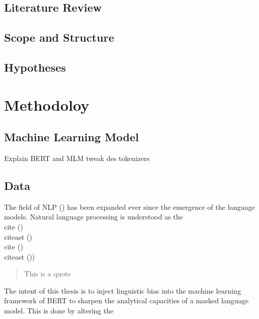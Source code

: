 \documentclass[english]{ttlab-qualify}
\begin{document}
    \section{Literature Review}
    \section{Scope and Structure}

    \section{Hypotheses}


    \chapter{Methodoloy}

    \section{Machine Learning Model}
    Explain BERT and MLM
    tweak des tokenizers
    \section{Data}



    



    The field of NLP  (\cite{METZLER2016}) has been expanded ever since the emergence of the language models.
    Natural language processing is understood as the
    \\

    cite (\cite{METZLER2016})\\
    citeast (\cite*{METZLER2016})\\

    cite (\cite{DEEPL})\\
    citeast ()\cite*{DEEPL})\\

    \begin{quote}
        This is a quote
    \end{quote}
    The intent of this thesis is to inject linguistic bias into the machine learning framework of BERT to sharpen the analytical capacities of a masked language model.
    This is done by altering the
    \appendix
    \printbibliography
\end{document}

